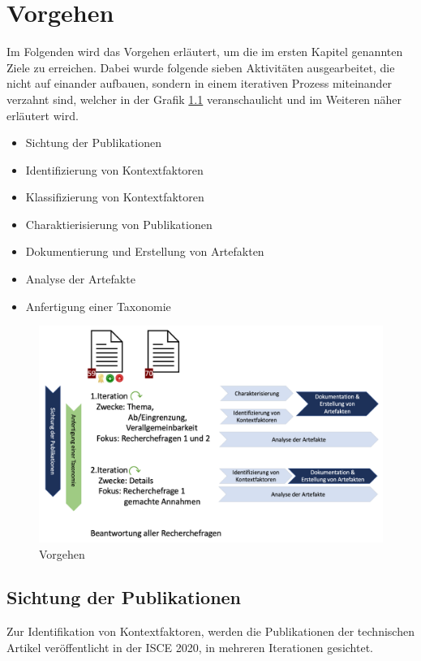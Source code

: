 \chapter{Vorgehen}
\label{chapter:vorgehen}
Im Folgenden wird das Vorgehen erläutert, um die im ersten Kapitel genannten Ziele zu erreichen.
Dabei wurde folgende sieben Aktivitäten ausgearbeitet, die nicht auf einander aufbauen,
sondern in einem iterativen Prozess miteinander verzahnt sind,
welcher in der Grafik \ref{img:process} veranschaulicht und im Weiteren näher erläutert wird. \\

\begin{itemize}
    \item Sichtung der Publikationen
    \item Identifizierung von Kontextfaktoren
    \item Klassifizierung von Kontextfaktoren
    \item Charaktierisierung von Publikationen
    \item Dokumentierung und Erstellung von Artefakten
    \item Analyse der Artefakte
    \item Anfertigung einer Taxonomie
\end{itemize}

\begin{figure}[thb]
    \centering
    \includegraphics[clip,width=0.9\linewidth]{content/images/03-Vorgehen}
    \caption{Vorgehen}
    \label{img:process}
\end{figure}

\clearpage

\section{Sichtung der Publikationen}
Zur Identifikation von Kontextfaktoren, werden die Publikationen der technischen Artikel veröffentlicht in der ISCE 2020, in mehreren Iterationen gesichtet. \\


